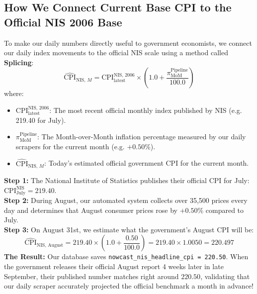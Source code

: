 \documentclass[11pt,a4paper,oneside]{article}
\begin{document}
\subsection{How We Connect Current Base CPI to the Official NIS 2006 Base}
To make our daily numbers directly useful to government economists, we connect our daily index movements to the official NIS scale using a method called \textbf{Splicing}:
\begin{equation}
\widehat{\text{CPI}}_{\text{NIS, } M} = \text{CPI}_{\text{latest}}^{\text{NIS, 2006}} \times \left( 1.0 + \frac{\pi_{\text{MoM}}^{\text{Pipeline}}}{100.0} \right)
\end{equation}
where:
\begin{itemize}[noitemsep]
    \item $\text{CPI}_{\text{latest}}^{\text{NIS, 2006}}$: The most recent official monthly index published by NIS (e.g. 219.40 for July).
    \item $\pi_{\text{MoM}}^{\text{Pipeline}}$: The Month-over-Month inflation percentage measured by our daily scrapers for the current month (e.g. $+0.50\%$).
    \item $\widehat{\text{CPI}}_{\text{NIS, } M}$: Today's estimated official government CPI for the current month.
\end{itemize}

\begin{tcolorbox}[colback=white,colframe=NavyBlue,title=\textbf{Real-World Splicing Example: Connecting 100.0 to 219.4}]
\textbf{Step 1:} The National Institute of Statistics publishes their official CPI for July: $\text{CPI}_{\text{July}}^{\text{NIS}} = \mathbf{219.40}$.\\
\textbf{Step 2:} During August, our automated system collects over 35,500 prices every day and determines that August consumer prices rose by $\mathbf{+0.50\%}$ compared to July.\\
\textbf{Step 3:} On August 31st, we estimate what the government's August CPI will be:
$$\widehat{\text{CPI}}_{\text{NIS, August}} = 219.40 \times \left( 1.0 + \frac{0.50}{100.0} \right) = 219.40 \times 1.0050 = \mathbf{220.497}$$
\textbf{The Result:} Our database saves \texttt{nowcast\_nis\_headline\_cpi = 220.50}. When the government releases their official August report 4 weeks later in late September, their published number matches right around $220.50$, validating that our daily scraper accurately projected the official benchmark a month in advance!
\end{tcolorbox}
\end{document}

